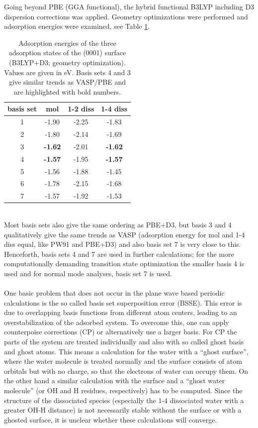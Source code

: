 \documentclass[11pt,DIV=13,BCOR=5mm,a4paper,headinclude]{scrbook}
\begin{document}
Going beyond PBE (GGA functional), the hybrid functional B3LYP including D3 dispersion corrections was applied.
Geometry optimizations were performed and adsorption energies were examined, see Table \ref{tab:basisset-results-B3LYP+D3}.
 \begin{table}[!h]
  \centering
   \caption{Adsorption energies of the three adsorption states of the (0001) surface (B3LYP+D3; geometry optimization).
Values are given in eV.
Basis sets 4 and 3 give similar trends as VASP/PBE and are highlighted with bold numbers.}
  \begin{tabular}{c|ccc}
  \toprule
  basis set & mol & 1-2 diss & 1-4 diss \\\midrule
  1 &-1.90 &-2.25 &-1.83 \\
  2 &-1.80 &-2.14 &-1.69 \\
  3 &\textbf{-1.62} &-2.01 &\textbf{-1.62} \\
  4 &\textbf{-1.57} &-1.95 &\textbf{-1.57} \\
  5 &-1.56 &-1.88 &-1.45 \\
  6 &-1.78 &-2.15 &-1.68 \\
  7 &-1.57 &-1.92 &-1.53 \\\bottomrule
  \end{tabular}
  \label{tab:basisset-results-B3LYP+D3}
\end{table}
\\
Most basis sets also give the same ordering as PBE+D3, but basis 3 and 4 qualitatively give the same trends as VASP (adsorption energy for mol and 1-4 diss equal, like PW91 and PBE+D3) and also basis set 7 is very close to this.
Henceforth, basis sets 4 and 7 are used in further calculations; for the more computationally demanding transition state optimization the smaller basis 4 is used and for normal mode analyses, basis set 7 is used.
\\
\\

One basic problem that does not occur in the plane wave based periodic calculations is the so called basis set superposition error (BSSE).
This error is due to overlapping basis functions from different atom centers, leading to an overstabilization of the adsorbed system.
To overcome this, one can apply counterpoise corrections (CP) or alternatively use a larger basis.
For CP the parts of the system are treated individually and also with so called ghost basis and ghost atoms.
This means a calculation for the water with a ``ghost surface'', where the water molecule is treated normally and the surface consists of atom orbitals but with no charge, so that the electrons of water can occupy them.
On the other hand a similar calculation with the surface and a ``ghost water molecule'' (or OH and H residues, respectively) has to be computed.
Since the structure of the dissociated species (especially the 1-4 dissociated water with a greater OH-H distance) is not necessarily stable without the surface or with a ghosted surface, it is unclear whether these calculations will converge.
\\
\end{document}

